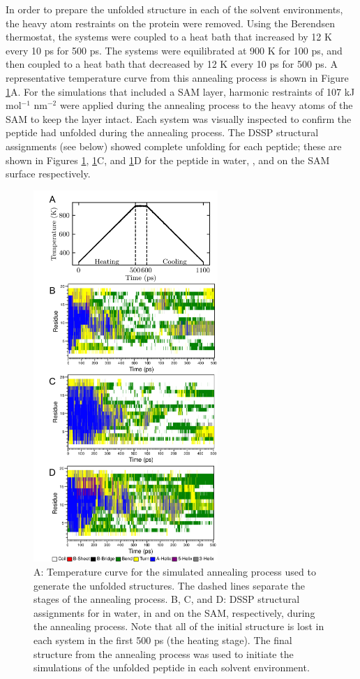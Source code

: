 In order to prepare the unfolded structure in each of the solvent environments, the heavy atom restraints on the protein were removed. 
Using the Berendsen thermostat, the systems were coupled to a heat bath that increased by 12 K every 10 ps for 500 ps. 
The systems were equilibrated at 900 K for 100 ps, and then coupled to a heat bath that decreased by 12 K every 10 ps for 500 ps. 
A representative temperature curve from this annealing process is shown in Figure \ref{fig:helix-anneal}A. 
For the simulations that included a SAM layer, harmonic restraints of 107 kJ mol$^{-1}$ nm$^{-2}$ were applied during the annealing process to the heavy atoms of the SAM to keep the layer intact. 
Each system was visually inspected to confirm the peptide had unfolded during the annealing process. 
The DSSP structural assignments (see below) showed complete unfolding for each peptide; 
these are shown in Figures \ref{fig:helix-anneal}, \ref{fig:helix-anneal}C, and \ref{fig:helix-anneal}D for the peptide in water, \tbawat{}, and on the SAM surface respectively.

\begin{figure}
    \center
    \includegraphics[width=2.75in]{figures-helix/unfolding.png}
    \caption{
        A: Temperature curve for the simulated annealing process used to generate the unfolded structures. 
        The dashed lines separate the stages of the annealing process. 
        B, C, and D: DSSP structural assignments for \pep{} in water, in \tbawat{} and on the SAM, respectively, during the annealing process. 
        Note that all of the initial structure is lost in each system in the first 500 ps (the heating stage). 
        The final structure from the annealing process was used to initiate the simulations of the unfolded peptide in each solvent environment.
    }
    \label{fig:helix-anneal}
\end{figure}

